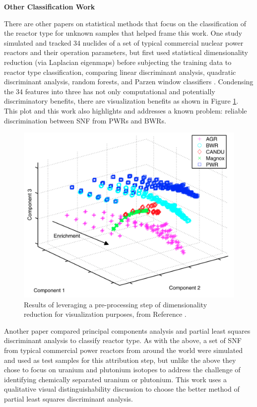 \noindent \textbf{Other Classification Work}

There are other papers on statistical methods that focus on the classification
of the reactor type for unknown samples that helped frame this work.  One study
simulated and tracked 34 nuclides of a set of typical commercial nuclear power
reactors and their operation parameters, but first used statistical
dimensionality reduction (via Laplacian eigenmaps) before subjecting the
training data to reactor type classification, comparing linear discriminant
analysis, quadratic discriminant analysis, random forests, and Parzen window
classifiers \cite{jones_snf_2014}.  Condensing the 34 features into three has
not only computational and potentially discriminatory benefits, there are
visualization benefits as shown in Figure \ref{fig:jones}.  This plot and this
work also highlights and addresses a known problem: reliable discrimination
between \gls{SNF} from \glspl{PWR} and \glspl{BWR}. 

\begin{figure}[!htb]
  \centering
  \includegraphics[width=0.7\linewidth]{./chapters/litrev/jones.png}
  \caption[Example of dimensionality reduction for visualization]
          {Results of leveraging a pre-processing step of dimensionality 
           reduction for visualization purposes, from Reference 
           \cite{jones_snf_2014}.}
  \label{fig:jones}
\end{figure}

Another paper compared principal components analysis and partial least squares
discriminant analysis to classify reactor type. As with the above, a set of
\gls{SNF} from typical commercial power reactors from around the world were
simulated and used as test samples for this attribution step, but unlike the
above they chose to focus on uranium and plutonium isotopes to address the
challenge of identifying chemically separated uranium or plutonium. This work
uses a qualitative visual distinguishability discussion to choose the better
method of partial least squares discriminant analysis.

